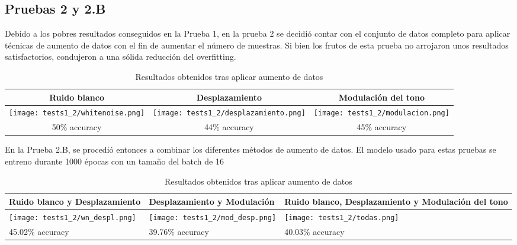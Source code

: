 \documentclass[11pt,a4paper,spanish]{book}
\begin{document}
	\subsection{Pruebas 2 y 2.B} %
	Debido a los pobres resultados conseguidos en la Prueba 1, en la prueba 2 se decidió contar con el conjunto de datos completo para aplicar técnicas de aumento de datos con el fin de aumentar el número de muestras. Si bien los frutos de esta prueba no arrojaron unos resultados satisfactorios, condujeron a una sólida reducción del overfitting.
	
	\begin{table}[H]
		\centering
		\begin{center}
			\begin{tabular}{| c | c | c |}
				\hline
				Ruido blanco & Desplazamiento & Modulación del tono \\ 
				\hline
				\texttt{[image: tests1\_2/whitenoise.png]} & \texttt{[image: tests1\_2/desplazamiento.png]} & \texttt{[image: tests1\_2/modulacion.png]}\\
				\hline
				50\% accuracy  & 44\%  accuracy & 45\% accuracy \\
				\hline	
			\end{tabular}
			\caption{Resultados obtenidos tras aplicar aumento de datos}
		\end{center}
	\end{table}
	En la Prueba 2.B, se procedió entonces a combinar los diferentes métodos de aumento de datos. El modelo usado para estas pruebas se entreno durante 1000 épocas con un tamaño del batch de 16
	
	\begin{table}[H]
		\centering
		\begin{center}
			\begin{tabular}{|p{4.75cm} |p{4.75cm} |p{4.75cm}|}
				\hline
				Ruido blanco y Desplazamiento& Desplazamiento y Modulación & Ruido blanco, Desplazamiento y Modulación del tono \\ 
				\hline
				\texttt{[image: tests1\_2/wn\_despl.png]} & \texttt{[image: tests1\_2/mod\_desp.png]} & \texttt{[image: tests1\_2/todas.png]}\\
				\hline
				45.02\% accuracy & 39.76\%  accuracy & 40.03\% accuracy \\
				\hline	
			\end{tabular}
			\caption{Resultados obtenidos tras aplicar aumento de datos}
		\end{center}
	\end{table}
	
\end{document}
